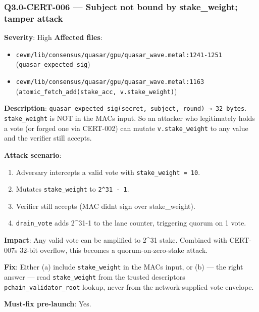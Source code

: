 \documentclass[
]{article}
\providecommand{\tightlist}{%
  \setlength{\itemsep}{0pt}\setlength{\parskip}{0pt}}
\begin{document}
\subsubsection{Q3.0-CERT-006 --- Subject not bound by stake\_weight;
tamper
attack}\label{q30-cert-006--subject-not-bound-by-stake_weight-tamper-attack}

\textbf{Severity}: High \textbf{Affected files}:

\begin{itemize}
\tightlist
\item
  \texttt{cevm/lib/consensus/quasar/gpu/quasar\_wave.metal:1241-1251}
  (\texttt{quasar\_expected\_sig})
\item
  \texttt{cevm/lib/consensus/quasar/gpu/quasar\_wave.metal:1163}
  (\texttt{atomic\_fetch\_add(stake\_acc,\ v.stake\_weight)})
\end{itemize}

\textbf{Description}:
\texttt{quasar\_expected\_sig(secret,\ subject,\ round)\ →\ 32\ bytes}.
\texttt{stake\_weight} is NOT in the MAC\textquotesingle s input. So an
attacker who legitimately holds a vote (or forged one via CERT-002) can
mutate \texttt{v.stake\_weight} to any value and the verifier still
accepts.

\textbf{Attack scenario}:

\begin{enumerate}
\def\labelenumi{\arabic{enumi}.}
\tightlist
\item
  Adversary intercepts a valid vote with \texttt{stake\_weight\ =\ 10}.
\item
  Mutates \texttt{stake\_weight} to \texttt{2\^{}31\ -\ 1}.
\item
  Verifier still accepts (MAC didn\textquotesingle t sign over
  stake\_weight).
\item
  \texttt{drain\_vote} adds 2\^{}31-1 to the lane counter, triggering
  quorum on 1 vote.
\end{enumerate}

\textbf{Impact}: Any valid vote can be amplified to 2\^{}31 stake.
Combined with CERT-007\textquotesingle s 32-bit overflow, this becomes a
quorum-on-zero-stake attack.

\textbf{Fix}: Either (a) include \texttt{stake\_weight} in the
MAC\textquotesingle s input, or (b) --- the right answer --- read
\texttt{stake\_weight} from the trusted descriptor\textquotesingle s
\texttt{pchain\_validator\_root} lookup, never from the network-supplied
vote envelope.

\textbf{Must-fix pre-launch}: Yes.
\end{document}
